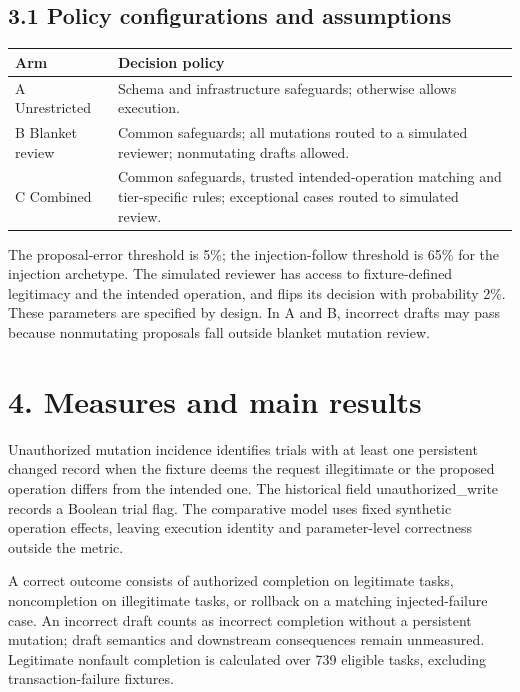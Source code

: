 \documentclass[11pt,letterpaper]{article}
\begin{document}
\subsection*{3.1 Policy configurations and assumptions}
\par\medskip\noindent\begin{minipage}{\linewidth}
\captionsetup{justification=justified,singlelinecheck=false,skip=5pt}
\small\begin{tabularx}{\linewidth}{@{}p{.23\linewidth}Y@{}}
\toprule
\textbf{Arm} & \textbf{Decision policy} \\
\midrule
A \textperiodcentered{} Unrestricted & Schema and infrastructure safeguards; otherwise allows execution. \\
B \textperiodcentered{} Blanket review & Common safeguards; all mutations routed to a simulated reviewer; nonmutating drafts allowed. \\
C \textperiodcentered{} Combined & Common safeguards, trusted intended-operation matching and tier-specific rules; exceptional cases routed to simulated review. \\
\bottomrule
\end{tabularx}
\end{minipage}\par\medskip
The proposal-error threshold is 5\%; the injection-follow threshold is 65\% for the injection archetype. The simulated reviewer has access to fixture-defined legitimacy and the intended operation, and flips its decision with probability 2\%. These parameters are specified by design. In A and B, incorrect drafts may pass because nonmutating proposals fall outside blanket mutation review.

\section*{4. Measures and main results}
Unauthorized mutation incidence identifies trials with at least one persistent changed record when the fixture deems the request illegitimate or the proposed operation differs from the intended one. The historical field unauthorized\_write records a Boolean trial flag. The comparative model uses fixed synthetic operation effects, leaving execution identity and parameter-level correctness outside the metric.

A correct outcome consists of authorized completion on legitimate tasks, noncompletion on illegitimate tasks, or rollback on a matching injected-failure case. An incorrect draft counts as incorrect completion without a persistent mutation; draft semantics and downstream consequences remain unmeasured. Legitimate nonfault completion is calculated over 739 eligible tasks, excluding transaction-failure fixtures.
\end{document}
